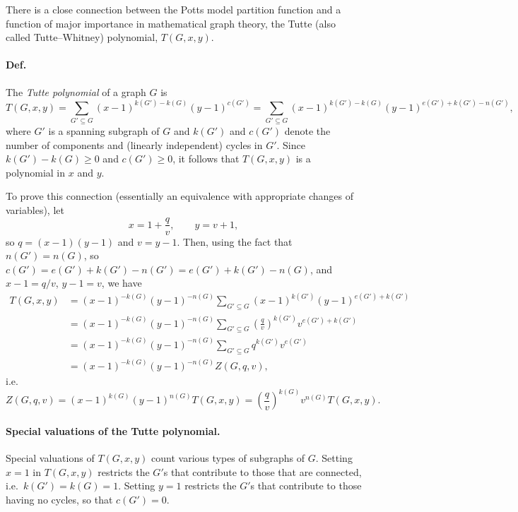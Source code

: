 There is a close connection between the Potts model partition function and a function of major importance in mathematical
graph theory, the Tutte (also called Tutte--Whitney) polynomial, $T(G,x,y)$.

\paragraph{Def.} The \emph{Tutte polynomial} of a graph $G$ is
\begin{equation}
  T(G,x,y) = \sum_{G'\subseteq G}(x-1)^{k(G')-k(G)}(y-1)^{c(G')}
           = \sum_{G'\subseteq G}(x-1)^{k(G')-k(G)}(y-1)^{e(G')+k(G')-n(G')},
\end{equation}
where $G'$ is a spanning subgraph of $G$ and $k(G')$ and $c(G')$ denote the number of components and (linearly independent)
cycles in $G'$. Since $k(G')-k(G)\ge 0$ and $c(G')\ge 0$, it follows that $T(G,x,y)$ is a polynomial in $x$ and $y$.

To prove this connection (essentially an equivalence with appropriate changes of variables), let
\begin{equation}
  x = 1+\frac{q}{v},\qquad y = v+1,
\end{equation}
so $q = (x-1)(y-1)$ and $v = y-1$. Then, using the fact that $n(G') = n(G)$, so
$c(G') = e(G')+k(G')-n(G') = e(G')+k(G')-n(G)$, and $x-1 = q/v$, $y-1 = v$, we have
\begin{align}
  T(G,x,y) &= (x-1)^{-k(G)}(y-1)^{-n(G)}\sum_{G'\subseteq G}(x-1)^{k(G')}(y-1)^{e(G')+k(G')}\nonumber\\
  &= (x-1)^{-k(G)}(y-1)^{-n(G)}\sum_{G'\subseteq G}\left(\frac{q}{v}\right)^{k(G')}v^{e(G')+k(G')}\nonumber\\
  &= (x-1)^{-k(G)}(y-1)^{-n(G)}\sum_{G'\subseteq G}q^{k(G')}v^{e(G')}\nonumber\\
  &= (x-1)^{-k(G)}(y-1)^{-n(G)}Z(G,q,v),
\end{align}
i.e.
\begin{equation}
  Z(G,q,v) = (x-1)^{k(G)}(y-1)^{n(G)}T(G,x,y) = \left(\frac{q}{v}\right)^{k(G)}v^{n(G)}T(G,x,y).
\end{equation}

\paragraph{Special valuations of the Tutte polynomial.}

Special valuations of $T(G,x,y)$ count various types of subgraphs of $G$. Setting $x = 1$ in $T(G,x,y)$ restricts the $G'$s
that contribute to those that are connected, i.e.\ $k(G') = k(G) = 1$. Setting $y = 1$ restricts the $G'$s that contribute to
those having no cycles, so that $c(G') = 0$.

